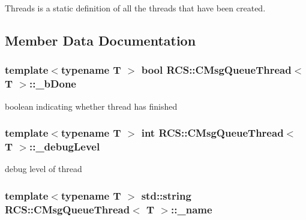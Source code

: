 Threads is a static definition of all the threads that have been created. 



\subsection{Member Data Documentation}
\hypertarget{classRCS_1_1CMsgQueueThread_abaca84c63f4938c14feb681aaa3065fa}{
\subsubsection[{\-\_\-b\-Done}]{\setlength{\rightskip}{0pt plus 5cm}template$<$typename T $>$ bool {\bf R\-C\-S\-::\-C\-Msg\-Queue\-Thread}$<$ T $>$\-::\-\_\-b\-Done\hspace{0.3cm}{\ttfamily [protected]}}}\label{classRCS_1_1CMsgQueueThread_abaca84c63f4938c14feb681aaa3065fa}
boolean indicating whether thread has finished \hypertarget{classRCS_1_1CMsgQueueThread_af5f49a26ae621445fb7034f9f22eee9e}{
\subsubsection[{\-\_\-debug\-Level}]{\setlength{\rightskip}{0pt plus 5cm}template$<$typename T $>$ int {\bf R\-C\-S\-::\-C\-Msg\-Queue\-Thread}$<$ T $>$\-::\-\_\-debug\-Level\hspace{0.3cm}{\ttfamily [protected]}}}\label{classRCS_1_1CMsgQueueThread_af5f49a26ae621445fb7034f9f22eee9e}
debug level of thread \hypertarget{classRCS_1_1CMsgQueueThread_a73e8b77421902303337324d84db7d35e}{
\subsubsection[{\-\_\-name}]{\setlength{\rightskip}{0pt plus 5cm}template$<$typename T $>$ std\-::string {\bf R\-C\-S\-::\-C\-Msg\-Queue\-Thread}$<$ T $>$\-::\-\_\-name\hspace{0.3cm}{\ttfamily [protected]}}}\label{classRCS_1_1CMsgQueueThread_a73e8b77421902303337324d84db7d35e}
